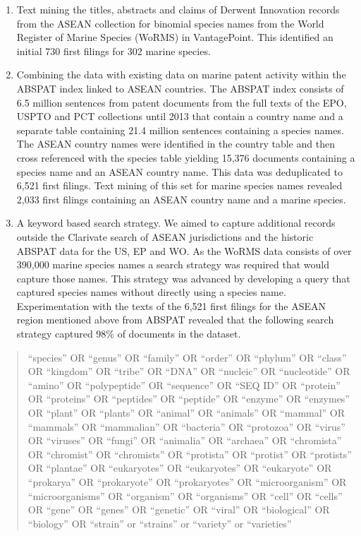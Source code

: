 \documentclass[openany]{book}
\theoremstyle{definition}
\theoremstyle{definition}
\theoremstyle{definition}
\theoremstyle{remark}
\begin{document}
\begin{enumerate}
\def\labelenumi{\alph{enumi})}
\item
  Text mining the titles, abstracts and claims of Derwent Innovation
  records from the ASEAN collection for binomial species names from the
  World Register of Marine Species (WoRMS) in VantagePoint. This
  identified an initial 730 first filings for 302 marine species.
\item
  Combining the data with existing data on marine patent activity within
  the ABSPAT index linked to ASEAN countries. The ABSPAT index consists
  of 6.5 million sentences from patent documents from the full texts of
  the EPO, USPTO and PCT collections until 2013 that contain a country
  name and a separate table containing 21.4 million sentences containing
  a species names. The ASEAN country names were identified in the
  country table and then cross referenced with the species table
  yielding 15,376 documents containing a species name and an ASEAN
  country name. This data was deduplicated to 6,521 first filings. Text
  mining of this set for marine species names revealed 2,033 first
  filings containing an ASEAN country name and a marine species.
\item
  A keyword based search strategy. We aimed to capture additional
  records outside the Clarivate search of ASEAN jurisdictions and the
  historic ABSPAT data for the US, EP and WO. As the WoRMS data consists
  of over 390,000 marine species names a search strategy was required
  that would capture those names. This strategy was advanced by
  developing a query that captured species names without directly using
  a species name. Experimentation with the texts of the 6,521 first
  filings for the ASEAN region mentioned above from ABSPAT revealed that
  the following search strategy captured 98\% of documents in the
  dataset.
\end{enumerate}

\begin{quote}
``species'' OR ``genus'' OR ``family'' OR ``order'' OR ``phylum'' OR
``class'' OR ``kingdom'' OR ``tribe'' OR ``DNA'' OR ``nucleic'' OR
``nucleotide'' OR ``amino'' OR ``polypeptide'' OR ``sequence'' OR ``SEQ
ID'' OR ``protein'' OR ``proteins'' OR ``peptides'' OR ``peptide'' OR
``enzyme'' OR ``enzymes'' OR ``plant'' OR ``plants'' OR ``animal'' OR
``animals'' OR ``mammal'' OR ``mammals'' OR ``mammalian'' OR
``bacteria'' OR ``protozoa'' OR ``virus'' OR ``viruses'' OR ``fungi'' OR
``animalia'' OR ``archaea'' OR ``chromista'' OR ``chromist'' OR
``chromists'' OR ``protista'' OR ``protist'' OR ``protists'' OR
``plantae'' OR ``eukaryotes'' OR ``eukaryotes'' OR ``eukaryote'' OR
``prokarya'' OR ``prokaryote'' OR ``prokaryotes'' OR ``microorganism''
OR ``microorganisms'' OR ``organism'' OR ``organisms'' OR ``cell'' OR
``cells'' OR ``gene'' OR ``genes'' OR ``genetic'' OR ``viral'' OR
``biological'' OR ``biology'' OR ``strain'' or ``strains'' or
``variety'' or ``varieties''
\end{quote}
\end{document}
